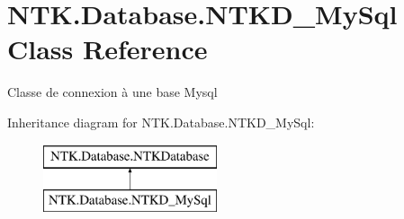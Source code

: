 \hypertarget{class_n_t_k_1_1_database_1_1_n_t_k_d___my_sql}{}\section{N\+T\+K.\+Database.\+N\+T\+K\+D\+\_\+\+My\+Sql Class Reference}
\label{class_n_t_k_1_1_database_1_1_n_t_k_d___my_sql}


Classe de connexion à une base Mysql  


Inheritance diagram for N\+T\+K.\+Database.\+N\+T\+K\+D\+\_\+\+My\+Sql\+:\begin{figure}[H]
\begin{center}
\leavevmode
\includegraphics[height=2.000000cm]{db/d64/class_n_t_k_1_1_database_1_1_n_t_k_d___my_sql}
\end{center}
\end{figure}
